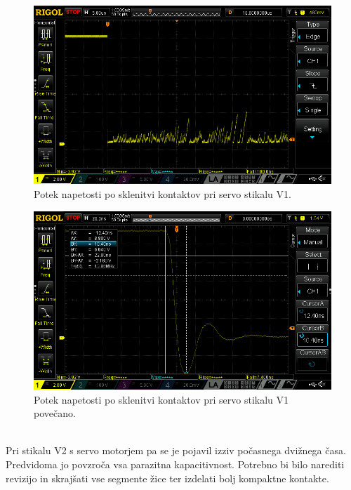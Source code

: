 \documentclass[a4paper,twoside,openright,12pt,Slovene]{book}
\begin{document}
    \begin{figure}[H]
        \centering
        \includegraphics[width=1\columnwidth]{Slike/ServoStikalo1/ServoStikalo1.png}
        \caption{\label{ServoStikalo1} Potek napetosti po sklenitvi kontaktov pri servo stikalu V1.}
    \end{figure}
    
    \begin{figure}[H]
        \centering
        \includegraphics[width=1\columnwidth]{Slike/ServoStikalo1/ServoStikalo1povecano.png}
        \caption{\label{ServoStikalo1povecano} Potek napetosti po sklenitvi kontaktov pri servo stikalu V1 povečano.}
    \end{figure}
    
    ~\\Pri stikalu V2 s servo motorjem pa se je pojavil izziv počasnega dvižnega časa. Predvidoma jo povzroča vsa parazitna kapacitivnost. Potrebno bi bilo narediti revizijo in skrajšati vse segmente žice ter izdelati bolj kompaktne kontakte.
    
\end{document}
